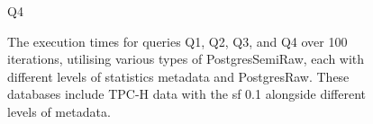 \begin{figure}[h!]
\begin{minipage}[b]{0.45\linewidth}
    \caption*{Q4}
\end{minipage}
\caption[The execution times for queries Q1, Q2, Q3, and Q4 over 100 iterations]{The execution times for queries Q1, Q2, Q3, and Q4 over 100 iterations, utilising various types of PostgresSemiRaw, each with different levels of statistics metadata and PostgresRaw. These databases include TPC-H data with the \acrshort{sf} 0.1 alongside different levels of metadata.}
\label{fig:execution_time_stat_group1}
\end{figure}
